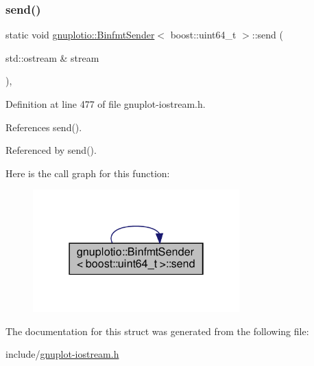 \subsubsection{\texorpdfstring{send()}{send()}}
{\footnotesize\ttfamily static void \hyperlink{structgnuplotio_1_1_binfmt_sender}{gnuplotio\+::\+Binfmt\+Sender}$<$ boost\+::uint64\+\_\+t $>$\+::send (\begin{DoxyParamCaption}\item[{std\+::ostream \&}]{stream }\end{DoxyParamCaption})\hspace{0.3cm}{\ttfamily [inline]}, {\ttfamily [static]}}



Definition at line 477 of file gnuplot-\/iostream.\+h.



References send().



Referenced by send().

Here is the call graph for this function\+:\nopagebreak
\begin{figure}[H]
\begin{center}
\leavevmode
\includegraphics[width=226pt]{structgnuplotio_1_1_binfmt_sender_3_01boost_1_1uint64__t_01_4_a9f57162a6baf940675236235556f62ba_cgraph}
\end{center}
\end{figure}


The documentation for this struct was generated from the following file\+:\begin{DoxyCompactItemize}
\item 
include/\hyperlink{gnuplot-iostream_8h}{gnuplot-\/iostream.\+h}\end{DoxyCompactItemize}
